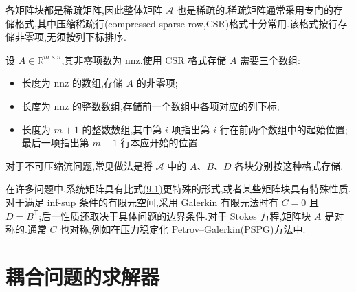 \begin{note}
\label{note:chapter9-csr-storage}
各矩阵块都是稀疏矩阵,因此整体矩阵 $\mathcal A$ 也是稀疏的.稀疏矩阵通常采用专门的存储格式,其中压缩稀疏行(compressed sparse row,CSR)格式十分常用.该格式按行存储非零项,无须按列下标排序.

设 $A\in\mathbb{R}^{m\times n}$,其非零项数为 $\mathrm{nnz}$.使用 CSR 格式存储 $A$ 需要三个数组:
\begin{itemize}
  \item 长度为 $\mathrm{nnz}$ 的数组,存储 $A$ 的非零项;
  \item 长度为 $\mathrm{nnz}$ 的整数数组,存储前一个数组中各项对应的列下标;
  \item 长度为 $m+1$ 的整数数组,其中第 $i$ 项指出第 $i$ 行在前两个数组中的起始位置;最后一项指出第 $m+1$ 行本应开始的位置.
\end{itemize}
对于不可压缩流问题,常见做法是将 $\mathcal A$ 中的 $A$、$B$、$D$ 各块分别按这种格式存储.
\end{note}

\begin{note}[系统矩阵的若干性质]
\label{note:chapter9-system-matrix-properties}
在许多问题中,系统矩阵具有比式\hyperref[eq:chapter9-coupled-system]{(9.1)}更特殊的形式,或者某些矩阵块具有特殊性质.对于满足 inf-sup 条件的有限元空间,采用 Galerkin 有限元法时有 $C=0$ 且 $D=B^{\mathsf T}$;后一性质还取决于具体问题的边界条件.对于 Stokes 方程,矩阵块 $A$ 是对称的.通常 $C$ 也对称,例如在压力稳定化 Petrov--Galerkin(PSPG)方法中.
\end{note}

\section{耦合问题的求解器}\label{sec:chapter9-coupled-solvers}

